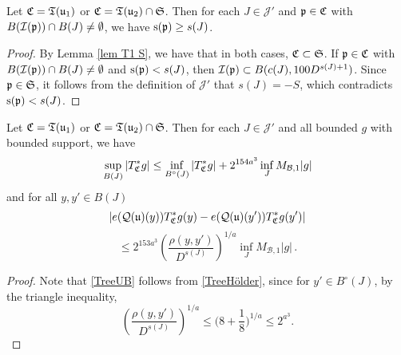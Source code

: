 {    \begin{lemma}
        \label{lem sep tree aux 4}
        Let $\mathfrak C = \mathfrak T(\mathfrak u_1)$ or $\mathfrak C = \mathfrak T(\mathfrak u_2) \cap \mathfrak{S}$. Then for each $J \in \mathcal{J}'$ and $\mathfrak p \in \mathfrak C$ with $B(\mathcal{I}(\mathfrak p)) \cap B(J) \neq \emptyset$, we have $\mathrm{s}(\mathfrak p) \ge s(J)$.
    \end{lemma}

    \begin{proof}
        By Lemma \ref{lem T1 S}, we have that in both cases, $\mathfrak C \subset \mathfrak{S}$. If $\mathfrak p \in \mathfrak C$ with $B(\mathcal{I}(\mathfrak p)) \cap B(J) \neq \emptyset$ and $\mathrm{s}(\mathfrak p) < s(J)$, then $\mathcal{I}(\mathfrak p) \subset B(c(J), 100 D^{s(J) + 1})$. Since $\mathfrak p \in \mathfrak{S}$, it follows from the definition of $\mathcal{J}'$ that $s(J) = -S$, which contradicts $\mathrm{s}(\mathfrak p) < s(J)$.
    \end{proof}

    \begin{lemma}
        \label{lem sep tree aux 1}
        Let $\mathfrak C = \mathfrak T(\mathfrak u_1)$ or $\mathfrak C = \mathfrak T(\mathfrak u_2) \cap \mathfrak{S}$. Then for each $J \in \mathcal{J}'$ and all bounded $g$ with bounded support, we have
        \begin{align}
            \label{TreeUB}
            \sup_{B(J)} |T_{\mathfrak C}^*g| \leq \inf_{B^\circ{}(J)} |T^*_{\mathfrak C} g| + 2^{154a^3} \inf_{J} M_{\mathcal{B}, 1} |g|
        \end{align}
        and for all $y,y' \in B(J)$
        $$
            |e(\mathcal{Q}(\mathfrak u)(y)) T_{\mathfrak C}^* g(y) - e(\mathcal{Q}(\mathfrak u)(y')) T_{\mathfrak C}^* g(y')|
        $$
        \begin{equation}
            \label{TreeHölder}
             \le 2^{153a^3} \left(\frac{\rho(y,y')}{D^{s(J)}}\right)^{1/a} \inf_J M_{\mathcal{B},1} |g|\,.
        \end{equation}
    \end{lemma}

    \begin{proof}
        Note that \eqref{TreeUB} follows from \eqref{TreeHölder}, since for $y'\in B^\circ{}(J)$, by the triangle inequality,
        $$\left(\frac{\rho(y,y')}{D^{s(J)}}\right)^{1/a}\le \Big(8 + \frac{1}8\Big)^{1/a}\le 2^{a^3}.$$


\end{proof}}
